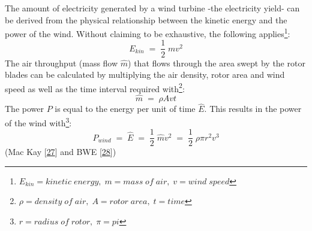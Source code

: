 \documentclass[a4paper,11pt]{article}
\begin{document}
The amount of electricity generated by a wind turbine -the electricity yield- can be derived from the physical relationship between the kinetic energy and the power of the wind. Without claiming to be exhaustive, the following applies\footnote{\(E_{kin}= kinetic\; energy,\; m=mass\; of\; air,\; v= wind\;speed\)}:
\begin{equation}
E_{kin}\; =\; \frac{1}{2}\;mv^2
\end{equation}
The air throughput (mass flow \(\hat{m}\)) that flows through the area swept by the rotor blades can be calculated by multiplying the air density, rotor area and wind speed as well as the time interval required with\footnote{\(\rho= density\; of\; air,\; A= rotor\; area,\; t=time\)}:
\begin{equation}
\hat{m}\;=\;\rho A vt
\end{equation}
The power \(P\) is equal to the energy per unit of time \(\hat{E}\). This results in the power of the wind with\footnote{\(r= radius\; of\; rotor, \; \pi=pi\)}:
\begin{equation}
P_{wind}\;=\;\hat{E}\;=\;\frac{1}{2}\;\hat{m}v^2\;=\;\frac{1}{2}\; \rho \pi r^2 v^3
\end{equation}
(Mac Kay {[}\protect\hyperlink{ref-DavidJCMacKay.2009}{27}{]} and BWE {[}\protect\hyperlink{ref-BWE.2021}{28}{]})
\end{document}
